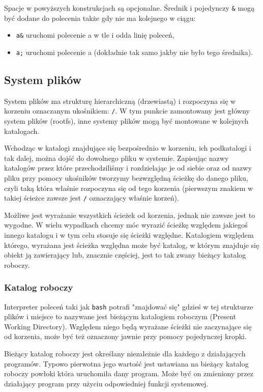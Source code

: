 Spacje w powyższych konstrukcjach są opcjonalne.
Średnik i pojedynczy \Verb$&$ mogą być dodane do polecenia także gdy nie ma kolejnego w ciągu:
\begin{itemize}
	\item \Verb$a&$ uruchomi polecenie a w tle i odda linię poleceń,
	\item \Verb$a;$ uruchomi polecenie a (dokładnie tak samo jakby nie było tego średnika).
\end{itemize}

\subsection{System plików}
System plików ma strukturę hierarchiczną (drzewiastą) i rozpoczyna się w korzeniu oznaczanym ukośnikiem: \Verb$/$. W tym punkcie zamontowany jest główny system plików (rootfs), inne systemy plików mogą być montowane w kolejnych katalogach.

Wchodząc w katalogi znajdujące się bezpośrednio w korzeniu, ich podkatalogi i tak dalej, można dojść do dowolnego pliku w systemie. Zapisując nazwy katalogów przez które przechodziliśmy i rozdzielając je od siebie oraz od nazwy pliku przy pomocy ukośników tworzymy bezwzględną ścieżkę do danego pliku, czyli taką która właśnie rozpoczyna się od tego korzenia (pierwszym znakiem w takiej ścieżce zawsze jest \Verb$/$ oznaczający właśnie korzeń).

Możliwe jest wyrażanie wszystkich ścieżek od korzenia, jednak nie zawsze jest to wygodne. W wielu wypadkach chcemy móc wyrazić ścieżkę względem jakiegoś innego katalogu i w tym celu stosuje się ścieżki względne. Katalogiem względem którego, wyrażana jest ścieżka względna może być katalog, w którym znajduje się obiekt ją zawierający lub, znacznie częściej, jest to tak zwany bieżący katalog roboczy.


\subsubsection{Katalog roboczy}
Interpreter poleceń taki jak \Verb$bash$ potrafi "znajdować się" gdzieś w tej strukturze plików i miejsce to nazywane jest bieżącym katalogiem roboczym (Present Working Directory). Względem niego będą wyrażane ścieżki nie zaczynające się od korzenia, może być też oznaczony jawnie przy pomocy pojedynczej kropki.

Bieżący katalog roboczy jest określany niezależnie dla każdego z działających programów. Typowo pierwotna jego wartość jest ustawiana na bieżący katalog roboczy powłoki która uruchomiła dany program. Może być on zmieniony przez działający program przy użyciu odpowiedniej funkcji systemowej.

